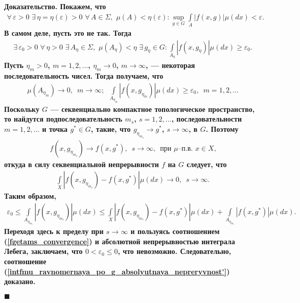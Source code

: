 \documentclass{report}
\newenvironment{Proof}{\par\noindent\bf Доказательство.\rm}{ $\blacksquare$\par}
\begin{document}
\begin{Proof}
Покажем, что
\begin{gather}\label{intfmu_ravnomernaya_po_g_absolyutnaya_nepreryvnost'}
\forall\,\varepsilon>0\,\,\exists\,\eta=\eta(\varepsilon)>0\,\,\forall\,A\in\Sigma,\,\,\mu(A)<\eta(\varepsilon):\sup\limits_{g\in G}\int\limits_A|f(x,g)|\mu(dx)<\varepsilon.
\end{gather}
В самом деле, пусть это не так. Тогда
\begin{gather*}
\exists\,\varepsilon_0>0\,\,\forall\,\eta>0\,\,\exists\,A_\eta\in\Sigma,\,\,\mu(A_\eta)<\eta\,\,\exists\,g_\eta\in G:\int\limits_{A_\eta}|f(x,g_\eta)|\mu(dx)\geqslant\varepsilon_0.
\end{gather*}
Пусть $\eta_m>0$, $m=1,2,\dots$, $\eta_m\to0$, $m\to\infty$, --- некоторая последовательность чисел. Тогда получаем, что
\begin{gather*}
\mu(A_{\eta_m})\to0,\,\,\,m\to\infty;\,\,\, \int\limits_{A_{\eta_m}}|f(x,g_{\eta_m})|\mu(dx)\geqslant\varepsilon_0,\,\,\,m=1,2,\dots
\end{gather*}
Поскольку $G$ --- секвенциально компактное топологическое пространство, то найдутся подпоследовательность $m_s$, $s=1,2,\dots$,
последовательности $m=1,2,\dots$ и точка $g^*\in G$, такие, что $g_{\eta_{m_s}}\to g^*$, $s\to\infty$, в $G$. Поэтому
\begin{gather*}
f(x,g_{\eta_{m_s}})\to f(x,g^*),\,\,\,s\to\infty,\,\,\,\mbox{при $\mu$--п.в. $x\in X$,}
\end{gather*}
откуда в силу секвенциальной непрерывности $f$ на $G$ следует, что
\begin{gather}\label{fgetams_convergence}
\int\limits_X|f(x,g_{\eta_{m_s}})-f(x,g^*)|\mu(dx)\to0,\,\,\,s\to\infty.
\end{gather}
Таким образом,
\begin{gather*}
\varepsilon_0\leqslant\int\limits_{A_{\eta_{m_s}}}|f(x,g_{\eta_{m_s}})|\mu(dx)\leqslant
\int\limits_X|f(x,g_{\eta_{m_s}})-f(x,g^*)|\mu(dx)+\int\limits_{A_{\eta_{m_s}}}|f(x,g^*)|\mu(dx).
\end{gather*}
Переходя здесь к пределу при $s\to\infty$ и пользуясь соотношением (\ref{fgetams_convergence}) и абсолютной непрерывностью интеграла Лебега,
заключаем, что $0<\varepsilon_0\leqslant0$, что невозможно. Следовательно, соотношение
(\ref{intfmu_ravnomernaya_po_g_absolyutnaya_nepreryvnost'}) доказано.


\end{Proof}
\end{document}

